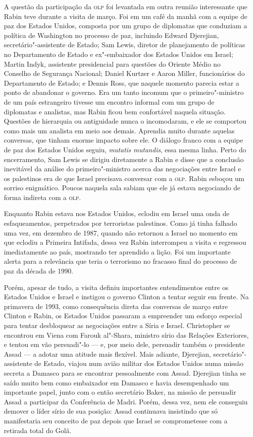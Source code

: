 A questão da participação da \textsc{olp} foi levantada em outra reunião
interessante que Rabin teve durante a visita de março. Foi em um café da
manhã com a equipe de paz dos Estados Unidos, composta por um grupo de
diplomatas que conduziam a política de Washington no processo de paz,
incluindo Edward Djerejian, secretário"-assistente de Estado; Sam Lewis,
diretor de planejamento de políticas no Departamento de Estado e
ex"-embaixador dos Estados Unidos em Israel; Martin Indyk, assistente
presidencial para questões do Oriente Médio no Conselho de Segurança
Nacional; Daniel Kurtzer e Aaron Miller, funcionários do Departamento de
Estado; e Dennis Ross, que naquele momento parecia estar a ponto de
abandonar o governo. Era um tanto incomum que o primeiro"-ministro de um
país estrangeiro tivesse um encontro informal com um grupo de diplomatas
e analistas, mas Rabin ficou bem confortável naquela situação. Questões
de hierarquia ou antiguidade nunca o incomodaram, e ele se comportou
como mais um analista em meio aos demais. Aprendia muito durante aquelas
conversas, que tinham enorme impacto sobre ele. O diálogo franco com a
equipe de paz dos Estados Unidos seguiu, \textit{mutatis mutandis}, essa
mesma linha. Perto do encerramento, Sam Lewis se dirigiu diretamente a
Rabin e disse que a conclusão inevitável da análise do primeiro"-ministro
acerca das negociações entre Israel e os palestinos era de que Israel
precisava conversar com a \textsc{olp}. Rabin esboçou um sorriso enigmático.
Poucos naquela sala sabiam que ele já estava negociando de forma
indireta com a \textsc{olp}.

Enquanto Rabin estava nos Estados Unidos, eclodiu em Israel uma onda de
esfaqueamentos, perpetrados por terroristas palestinos. Como já tinha
falhado uma vez, em dezembro de 1987, quando não retornou a Israel no
momento em que eclodiu a Primeira Intifada, dessa vez Rabin interrompeu
a visita e regressou imediatamente ao país, mostrando ter aprendido a
lição. Foi um importante alerta para a relevância que teria o terrorismo
no fracasso final do processo de paz da década de 1990.

Porém, apesar de tudo, a visita definiu importantes entendimentos entre
os Estados Unidos e Israel e instigou o governo Clinton a tentar seguir
em frente. Na primavera de 1993, como consequência direta das conversas
de março entre Clinton e Rabin, os Estados Unidos passaram a empreender
um esforço especial para tentar desbloquear as negociações entre a Síria
e Israel. Christopher se encontrou em Viena com Farouk al"-Shara,
ministro sírio das Relações Exteriores, e tentou em vão persuadi"-lo ---
e, por meio dele, persuadir também o presidente Assad --- a adotar uma
atitude mais flexível. Mais adiante, Djerejian, secretário"-assistente de Estado,
viajou num avião militar dos Estados Unidos numa missão
secreta a Damasco para se encontrar pessoalmente com Assad. Djerejian
tinha se saído muito bem como embaixador em Damasco e havia desempenhado
um importante papel, junto com o então secretário Baker, na missão de
persuadir Assad a participar da Conferência de Madri. Porém, dessa vez,
nem ele conseguiu demover o líder sírio de sua posição: Assad continuava
insistindo que só manifestaria seu conceito de paz depois que Israel se
comprometesse com a retirada total do Golã.

